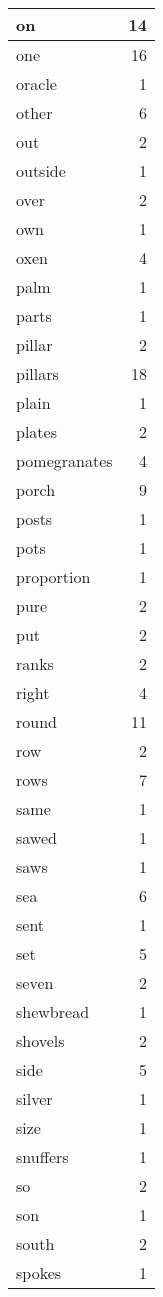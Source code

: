 \begin{center}
\begin{longtable}{l|r}
on & 14 \\ \hline
one & 16 \\ \hline
oracle & 1 \\ \hline
other & 6 \\ \hline
out & 2 \\ \hline
outside & 1 \\ \hline
over & 2 \\ \hline
own & 1 \\ \hline
oxen & 4 \\ \hline
palm & 1 \\ \hline
parts & 1 \\ \hline
pillar & 2 \\ \hline
pillars & 18 \\ \hline
plain & 1 \\ \hline
plates & 2 \\ \hline
pomegranates & 4 \\ \hline
porch & 9 \\ \hline
posts & 1 \\ \hline
pots & 1 \\ \hline
proportion & 1 \\ \hline
pure & 2 \\ \hline
put & 2 \\ \hline
ranks & 2 \\ \hline
right & 4 \\ \hline
round & 11 \\ \hline
row & 2 \\ \hline
rows & 7 \\ \hline
same & 1 \\ \hline
sawed & 1 \\ \hline
saws & 1 \\ \hline
sea & 6 \\ \hline
sent & 1 \\ \hline
set & 5 \\ \hline
seven & 2 \\ \hline
shewbread & 1 \\ \hline
shovels & 2 \\ \hline
side & 5 \\ \hline
silver & 1 \\ \hline
size & 1 \\ \hline
snuffers & 1 \\ \hline
so & 2 \\ \hline
son & 1 \\ \hline
south & 2 \\ \hline
spokes & 1 \\ \hline

\end{longtable}
\end{center}
